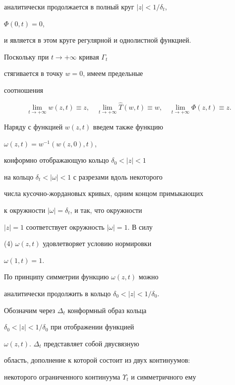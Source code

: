 аналитически продолжается в полный круг $|z|<1/\delta_{t}$,


$\Phi(0,t)=0$,


и является в этом круге регулярной и однолистной функцией.





Поскольку при $t\to +\infty$ кривая $\Gamma_{t}$ 


стягивается в точку $w=0$, имеем предельные


соотношения


\begin{equation}


\lim_{t\to +\infty}w(z,t)\equiv z,\quad


\lim_{t\to +\infty}\widehat{T}(w,t)\equiv w,\quad


\lim_{t\to +\infty}\Phi(z,t)\equiv z.


\end{equation}





Наряду с функцией $w(z,t)$ введем также функцию


$\omega(z,t)=w^{-1}(w(z,0),t)$,


конформно отображающую кольцо $\delta_{0}<|z|<1$


на кольцо $\delta_{t}<|\omega|<1$ с разрезами вдоль некоторого


числа кусочно-жордановых кривых, одним концом примыкающих


к окружности $|\omega|=\delta_{t}$, и так, что окружности


$|z|=1$ соответствует окружность $|\omega|=1$. В силу


(4) $\omega(z,t)$ удовлетворяет условию нормировки


$\omega(1,t)=1$.


По принципу симметрии функцию $\omega(z,t)$ можно 


аналитически продолжить в кольцо $\delta_{0}<|z|<1/\delta_{0}$.


Обозначим через $\Delta_{t}$ конформный образ кольца


$\delta_{0}<|z|<1/\delta_{0}$ при отображении функцией


$\omega(z,t)$.\; $\Delta_{t}$ представляет собой двусвязную 


область, дополнение к которой состоит из двух континуумов:


некоторого ограниченного континуума $\Upsilon_{t}$ и симметричного ему


